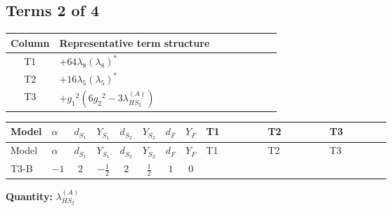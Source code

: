 \documentclass[8pt]{article}
\begin{document}
\begin{landscape}
\subsection*{Terms 2 of 4}
\begin{center}
\begin{tabular}{@{}c >{\raggedright\arraybackslash}p{0.82\linewidth}@{}}
\toprule
Column & Representative term structure \\
\midrule
T1 & \(\displaystyle +64 {\lambda_8} \left({\lambda_8}\right)^{*}\) \\
\midrule
T2 & \(\displaystyle +16 {\lambda_5} \left({\lambda_5}\right)^{*}\) \\
\midrule
T3 & \(\displaystyle +{g_1}^2 \left(6 {g_2}^2-3 {\lambda_{HS_2}^{(A)}}\right)\) \\
\midrule
\bottomrule
\end{tabular}
\end{center}
\smallskip
\tiny
\begin{longtable}{@{}llcccccc >{\raggedright\arraybackslash}p{0.21\linewidth} >{\raggedright\arraybackslash}p{0.21\linewidth} >{\raggedright\arraybackslash}p{0.21\linewidth}@{}}
\toprule
Model & $\alpha$ & $d_{S_1}$ & $Y_{S_1}$ & $d_{S_2}$ & $Y_{S_2}$ & $d_F$ & $Y_F$ & T1 & T2 & T3 \\
\midrule
\endfirsthead
\toprule
Model & $\alpha$ & $d_{S_1}$ & $Y_{S_1}$ & $d_{S_2}$ & $Y_{S_2}$ & $d_F$ & $Y_F$ & T1 & T2 & T3 \\
\midrule
\endhead
T3-B & $-1$ & $2$ & $-\frac{1}{2}$ & $2$ & $\frac{1}{2}$ & $1$ & $0$ & \scriptsize\adjustbox{max width=\linewidth}{$\begin{gathered} +64 {\lambda_8} \left({\lambda_8}\right)^{*}\end{gathered}$} & \scriptsize\adjustbox{max width=\linewidth}{$\begin{gathered} +16 {\lambda_5} \left({\lambda_5}\right)^{*}\end{gathered}$} & \scriptsize\adjustbox{max width=\linewidth}{$\begin{gathered} +{g_1}^2 \left(6 {g_2}^2-3 {\lambda_{HS_2}^{(A)}}\right)\end{gathered}$} \\
\midrule
\bottomrule
\end{longtable}
\clearpage
\noindent\textbf{Quantity: }$\lambda_{HS_2}^{(A)}$\par\smallskip

\end{landscape}
\end{document}

